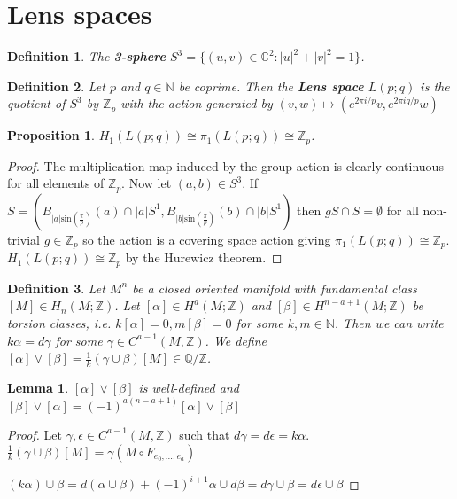 \documentclass{report}
\newtheorem{definition}{Definition}
\newtheorem{lemma}{Lemma}
\newtheorem{proposition}{Proposition}
\begin{document}
\section{Lens spaces}
\begin{definition}
The \textbf{3-sphere } $S^3=\{(u,v)\in\mathbb{C}^2:|u|^2+|v|^2=1\}$.
\end{definition}

\begin{definition}
Let $p$ and $q\in\mathbb{N}$ be coprime. Then the \textbf{Lens space} $L(p;q)$ is the quotient of $S^3$ by $\mathbb{Z}_p$ with the action generated by $(v,w)\mapsto(e^{2\pi i/p}v,e^{2\pi iq/p}w)$
\end{definition}

\begin{proposition}
$H_1(L(p;q))\cong\pi_1(L(p;q))\cong \mathbb{Z}_p$.
\end{proposition}
\begin{proof}
The multiplication map induced by the group action is clearly continuous for all elements of $\mathbb{Z}_p$.
Now let $(a,b)\in S^3$. If $S=(B_{|a|\text{sin}(\frac{\pi}{p})}(a)\cap |a|S^1,B_{|b|\text{sin}(\frac{\pi}{p})}(b)\cap |b|S^1)$ then $gS\cap S=\emptyset$ for all non-trivial $g\in \mathbb{Z}_p$ so the action is a covering space action giving $\pi_1(L(p;q))\cong \mathbb{Z}_p$. $H_1(L(p;q))\cong \mathbb{Z}_p$ by the Hurewicz theorem.
\end{proof}

\begin{definition}
Let $M^n$ be a closed oriented manifold with fundamental class $[M]\in H_n(M;\mathbb{Z})$. Let $[\alpha]\in H^a(M;\mathbb{Z})$ and $[\beta]\in H^{n-a+1}(M;\mathbb{Z})$ be torsion classes, i.e. $k[\alpha]=0,m[\beta]=0$ for some $k,m\in\mathbb{N}$. Then we can write $k\alpha=d\gamma$ for some $\gamma\in C^{a-1}(M,\mathbb{Z})$. We define $[\alpha]\vee[\beta]=\frac{1}{k}(\gamma\cup\beta)[M]\in\mathbb{Q}/\mathbb{Z}$.
\end{definition}
\begin{lemma}
$[\alpha]\vee[\beta]$ is well-defined and $[\beta]\vee[\alpha]=(-1)^{a(n-a+1)}[\alpha]\vee[\beta]$
\end{lemma}
\begin{proof}
Let $\gamma,\epsilon\in C^{a-1}(M,\mathbb{Z})$ such that $d\gamma=d\epsilon=k\alpha$.
$\frac{1}{k}(\gamma\cup\beta)[M]=\gamma(M\circ F_{e_0,...,e_a})$

$(k\alpha)\cup\beta=d(\alpha\cup\beta)+(-1)^{i+1}\alpha\cup d\beta=d\gamma\cup\beta=d\epsilon\cup\beta$
\end{proof}
\end{document}
